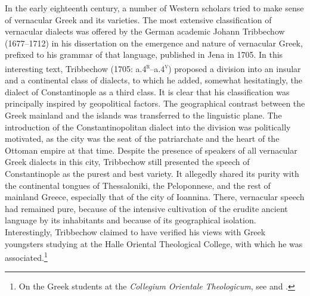 In the early eighteenth century, a number of Western scholars tried to make sense of vernacular Greek and its varieties. The most extensive classification of vernacular dialects was offered by the German academic Johann Tribbechow (1677–1712) in his dissertation on the emergence and nature of vernacular Greek, prefixed to his grammar of that language, published in Jena in 1705. In this interesting text, Tribbechow (1705: a.4\textsc{\textsuperscript{r}}\textsc{–}a.4\textsc{\textsuperscript{v}}) proposed a division into an insular and a continental class of dialects, to which he added, somewhat hesitatingly, the dialect of Constantinople as a third class. It is clear that his classification was principally inspired by geopolitical factors. The geographical contrast between the Greek mainland and the islands was transferred to the linguistic plane. The introduction of the Constantinopolitan dialect into the division was politically motivated, as the city was the seat of the patriarchate and the heart of the Ottoman empire at that time. Despite the presence of speakers of all vernacular Greek dialects in this city, Tribbechow still presented the speech of Constantinople as the purest and best variety. It allegedly shared its purity with the continental tongues of Thessaloniki, the Peloponnese, and the rest of mainland Greece, especially that of the city of Ioannina. There, vernacular speech had remained pure, because of the intensive cultivation of the erudite ancient language by its inhabitants and because of its geographical isolation. Interestingly, Tribbechow claimed to have verified his views with Greek youngsters studying at the Halle Oriental Theological College, with which he was associated.\footnote{On the Greek students at the \textit{Collegium} \textit{Orientale} \textit{Theologicum}, see \citet{Moennig1998} and \citet[283]{Makrides2006}.}

